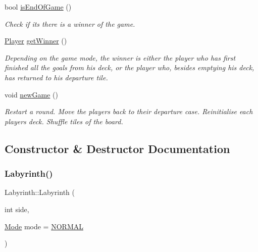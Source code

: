\begin{DoxyCompactItemize}
bool \mbox{\hyperlink{classLabyrinth_a7685687fa2cd4fe73aa5d5643ac5d78b}{is\+End\+Of\+Game}} ()
\begin{DoxyCompactList}\small\item\em Check if it\textquotesingle{}s there is a winner of the game. \end{DoxyCompactList}\item 
\mbox{\hyperlink{classPlayer}{Player}} \mbox{\hyperlink{classLabyrinth_a5180cf4972163afe609de1e1df4ae49f}{get\+Winner}} ()
\begin{DoxyCompactList}\small\item\em Depending on the game mode, the winner is either the player who has first finished all the goals from his deck, or the player who, besides emptying his deck, has returned to his departure tile. \end{DoxyCompactList}\item 
void \mbox{\hyperlink{classLabyrinth_a550a98e5fb1d3a278527e716231f620b}{new\+Game}} ()
\begin{DoxyCompactList}\small\item\em Restart a round. Move the players back to their departure case. Reinitialise each player\textquotesingle{}s deck. Shuffle tiles of the board. \end{DoxyCompactList}\end{DoxyCompactItemize}


\subsection{Constructor \& Destructor Documentation}
\mbox{\label{classLabyrinth_a505ac0ac3ae87c1415ea30b6cf542bf5}} 
\subsubsection{\texorpdfstring{Labyrinth()}{Labyrinth()}}
{\footnotesize\ttfamily Labyrinth\+::\+Labyrinth (\begin{DoxyParamCaption}\item[{int}]{side,  }\item[{\mbox{\hyperlink{mode_8h_a46c8a310cf4c094f8c80e1cb8dc1f911}{Mode}}}]{mode = {\ttfamily \mbox{\hyperlink{mode_8h_a46c8a310cf4c094f8c80e1cb8dc1f911a50d1448013c6f17125caee18aa418af7}{N\+O\+R\+M\+AL}}} }\end{DoxyParamCaption})}


